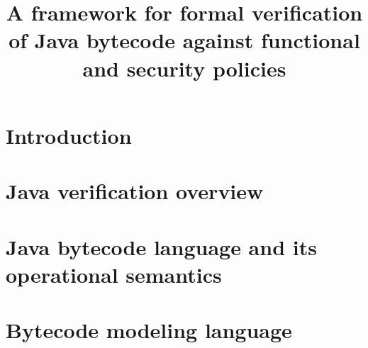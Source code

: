 \documentclass[book,10pt]{book}
\title{ A framework for formal verification of Java bytecode against  functional and security policies}
\begin{document}
    \lstset{language=Jml}
    \lstset{frameround=tttt}

    \renewcommand{\topfraction}{0.9}
    \renewcommand{\textfraction}{0.05}
    \renewcommand{\floatpagefraction}{0.75}

\maketitle
\tableofcontents


\chapter{Introduction}
  \label{intro}
 
\chapter{Java verification overview}\label{javaVerif}
   
   
   
%   
   
   	
   
   
   
\chapter{Java bytecode language and its operational semantics} \label{opSem:prelim}
     
   
   
   
   
   
   
   
   
   
   
  
   
  
   

\chapter{Bytecode modeling language} \label{bcsl}
  \lstset{numbers=left,numberstyle=\small,stepnumber=1,numbersep=5pt}
   
  
  
  
  
  
\end{document}
